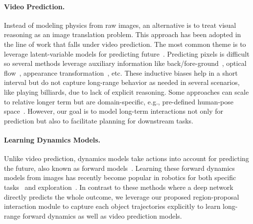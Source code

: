 \documentclass{article} \usepackage{iclr2021_conference,times}
\begin{document}
\vspace{-0.5em}
\paragraph{Video Prediction.}
Instead of modeling physics from raw images, an alternative is to treat visual reasoning as an image translation problem. This approach has been adopted in the line of work that falls under video prediction. The most common theme is to leverage latent-variable models for predicting future~\citep{lee2018stochastic,denton2018stochastic,babaeizadeh2017stochastic}. Predicting pixels is difficult so several methods leverage auxiliary information like back/fore-ground~\citep{villegas2017decomposing,tulyakov2017mocogan,vondrick2016generating}, optical flow~\citep{walker2016uncertain,liu2017video}, appearance transformation~\citep{jia2016dynamic,finn2016unsupervised,chen2017video,xue2016visual}, etc. These inductive biases help in a short interval but do not capture long-range behavior as needed in several scenarios, like playing billiards, due to lack of explicit reasoning.
Some approaches can scale to relative longer term but are domain-specific, e.g., pre-defined human-pose space~\citep{villegas2017learning,walker2017pose}.
However, our goal is to 
model long-term interactions not only for prediction but also to facilitate planning for downstream tasks.

\vspace{-0.5em}
\paragraph{Learning Dynamics Models.}
Unlike video prediction, dynamics models take actions into account for predicting the future, also known as forward models~\citep{jordan1992forward}. Learning these forward dynamics models from images has recently become popular in robotics for both specific tasks~\citep{wahlstrom2015pixels,agrawal2016learning,oh2015action,finn2016unsupervised} and exploration~\citep{pathak2017curiosity,burdaICLR19largescale}.
In contrast to these methods where a deep network directly predicts the whole outcome, we leverage our proposed region-proposal interaction module to capture each object trajectories explicitly to learn long-range forward dynamics as well as video prediction models.

\vspace{-0.5em}
\end{document}
